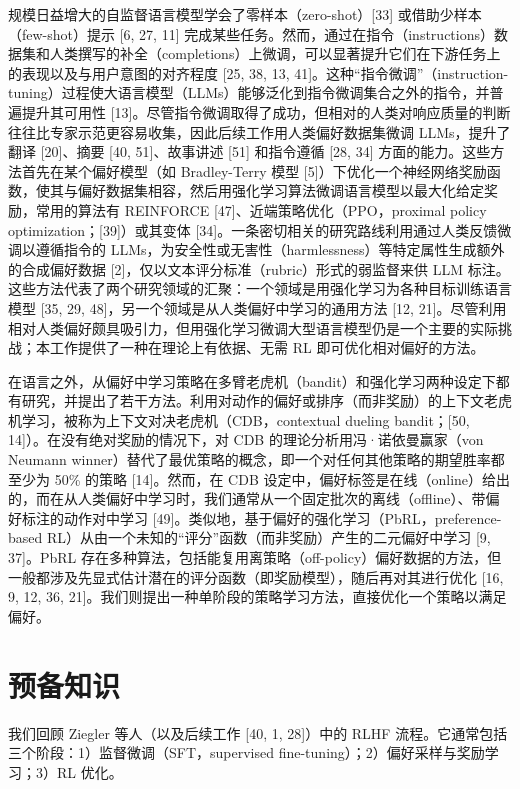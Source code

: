 \documentclass[11pt,UTF8,fontset=fandol]{ctexart}
\begin{document}
规模日益增大的自监督语言模型学会了零样本（zero-shot）[33] 或借助少样本（few-shot）提示 [6, 27, 11] 完成某些任务。然而，通过在指令（instructions）数据集和人类撰写的补全（completions）上微调，可以显著提升它们在下游任务上的表现以及与用户意图的对齐程度 [25, 38, 13, 41]。这种“指令微调”（instruction-tuning）过程使大语言模型（LLMs）能够泛化到指令微调集合之外的指令，并普遍提升其可用性 [13]。尽管指令微调取得了成功，但相对的人类对响应质量的判断往往比专家示范更容易收集，因此后续工作用人类偏好数据集微调 LLMs，提升了翻译 [20]、摘要 [40, 51]、故事讲述 [51] 和指令遵循 [28, 34] 方面的能力。这些方法首先在某个偏好模型（如 Bradley-Terry 模型 [5]）下优化一个神经网络奖励函数，使其与偏好数据集相容，然后用强化学习算法微调语言模型以最大化给定奖励，常用的算法有 REINFORCE [47]、近端策略优化（PPO，proximal policy optimization；[39]）或其变体 [34]。一条密切相关的研究路线利用通过人类反馈微调以遵循指令的 LLMs，为安全性或无害性（harmlessness）等特定属性生成额外的合成偏好数据 [2]，仅以文本评分标准（rubric）形式的弱监督来供 LLM 标注。这些方法代表了两个研究领域的汇聚：一个领域是用强化学习为各种目标训练语言模型 [35, 29, 48]，另一个领域是从人类偏好中学习的通用方法 [12, 21]。尽管利用相对人类偏好颇具吸引力，但用强化学习微调大型语言模型仍是一个主要的实际挑战；本工作提供了一种在理论上有依据、无需 RL 即可优化相对偏好的方法。

在语言之外，从偏好中学习策略在多臂老虎机（bandit）和强化学习两种设定下都有研究，并提出了若干方法。利用对动作的偏好或排序（而非奖励）的上下文老虎机学习，被称为上下文对决老虎机（CDB，contextual dueling bandit；[50, 14]）。在没有绝对奖励的情况下，对 CDB 的理论分析用冯·诺依曼赢家（von Neumann winner）替代了最优策略的概念，即一个对任何其他策略的期望胜率都至少为 50\% 的策略 [14]。然而，在 CDB 设定中，偏好标签是在线（online）给出的，而在从人类偏好中学习时，我们通常从一个固定批次的离线（offline）、带偏好标注的动作对中学习 [49]。类似地，基于偏好的强化学习（PbRL，preference-based RL）从由一个未知的“评分”函数（而非奖励）产生的二元偏好中学习 [9, 37]。PbRL 存在多种算法，包括能复用离策略（off-policy）偏好数据的方法，但一般都涉及先显式估计潜在的评分函数（即奖励模型），随后再对其进行优化 [16, 9, 12, 36, 21]。我们则提出一种单阶段的策略学习方法，直接优化一个策略以满足偏好。

\section{预备知识}

我们回顾 Ziegler 等人（以及后续工作 [40, 1, 28]）中的 RLHF 流程。它通常包括三个阶段：1）监督微调（SFT，supervised fine-tuning）；2）偏好采样与奖励学习；3）RL 优化。
\end{document}

